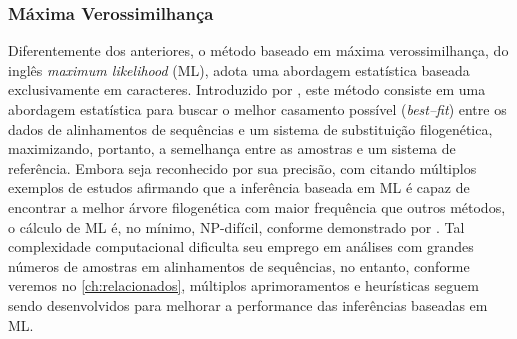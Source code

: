 \documentclass[english,brazilian]{UNISINOSmonografia} %
\begin{document}


\subsubsection{Máxima Verossimilhança}
\label{sub:bio-max-likelyhood}

Diferentemente dos anteriores, o método baseado em máxima verossimilhança, do inglês \textit{maximum likelihood} (ML), adota uma abordagem estatística baseada exclusivamente em caracteres.
Introduzido por , este método consiste em uma abordagem estatística para buscar o melhor casamento possível (\textit{best--fit}) entre os dados de alinhamentos de sequências e um sistema de substituição filogenética, maximizando, portanto, a semelhança entre as amostras e um sistema de referência.
Embora seja reconhecido por sua precisão, com  citando múltiplos exemplos de estudos afirmando que a inferência baseada em ML é capaz de encontrar a melhor árvore filogenética com maior frequência que outros métodos, o cálculo de ML é, no mínimo, NP-difícil, conforme demonstrado por .
Tal complexidade computacional dificulta seu emprego em análises com grandes números de amostras em alinhamentos de sequências, no entanto, conforme veremos no \autoref{ch:relacionados}, múltiplos aprimoramentos e heurísticas seguem sendo desenvolvidos para melhorar a performance das inferências baseadas em ML.





\end{document}
